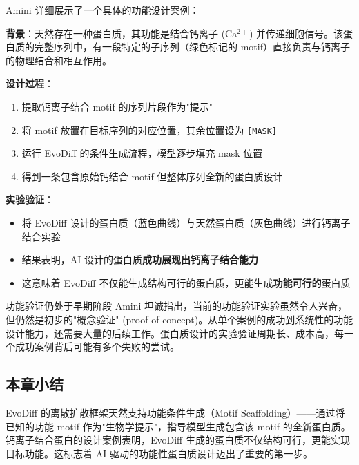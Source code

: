 Amini 详细展示了一个具体的功能设计案例：

\textbf{背景}：天然存在一种蛋白质，其功能是结合钙离子 (Ca$^{2+}$) 并传递细胞信号。该蛋白质的完整序列中，有一段特定的子序列（绿色标记的 motif）直接负责与钙离子的物理结合和相互作用。

\textbf{设计过程}：
\begin{enumerate}
    \item 提取钙离子结合 motif 的序列片段作为"提示"
    \item 将 motif 放置在目标序列的对应位置，其余位置设为 \texttt{[MASK]}
    \item 运行 EvoDiff 的条件生成流程，模型逐步填充 mask 位置
    \item 得到一条包含原始钙结合 motif 但整体序列全新的蛋白质设计
\end{enumerate}

\textbf{实验验证}：
\begin{itemize}
    \item 将 EvoDiff 设计的蛋白质（蓝色曲线）与天然蛋白质（灰色曲线）进行钙离子结合实验
    \item 结果表明，AI 设计的蛋白质\textbf{成功展现出钙离子结合能力}
    \item 这意味着 EvoDiff 不仅能生成结构可行的蛋白质，更能生成\textbf{功能可行的}蛋白质
\end{itemize}

\begin{warningbox}{功能验证仍处于早期阶段}
Amini 坦诚指出，当前的功能验证实验虽然令人兴奋，但仍然是初步的"概念验证" (proof of concept)。从单个案例的成功到系统性的功能设计能力，还需要大量的后续工作。蛋白质设计的实验验证周期长、成本高，每一个成功案例背后可能有多个失败的尝试。
\end{warningbox}

\subsection{本章小结}

EvoDiff 的离散扩散框架天然支持功能条件生成（Motif Scaffolding）——通过将已知的功能 motif 作为"生物学提示"，指导模型生成包含该 motif 的全新蛋白质。钙离子结合蛋白的设计案例表明，EvoDiff 生成的蛋白质不仅结构可行，更能实现目标功能。这标志着 AI 驱动的功能性蛋白质设计迈出了重要的第一步。


